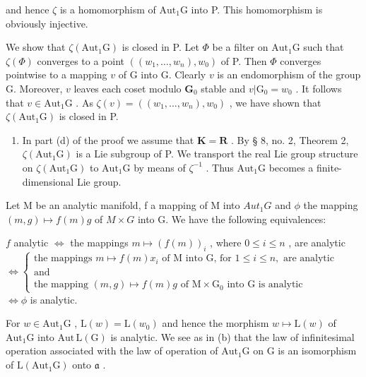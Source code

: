 and hence \(\zeta\) is a homomorphism of \(\mathrm{Aut}_1\mathrm{G}\) into P. This homomorphism is obviously injective.

We show that \(\zeta(\mathrm{Aut}_1\mathrm{G})\) is closed in P. Let \(\Phi\) be a filter on \(\mathrm{Aut}_1\mathrm{G}\) such that \(\zeta(\Phi)\) converges to a point \(((w_1,\dots,w_n),w_0)\) of P. Then \(\Phi\) converges pointwise to a mapping \(v\) of G into G. Clearly \(v\) is an endomorphism of the group G. Moreover, \(v\) leaves each coset modulo \(\mathbf{G}_0\) stable and \(v |\mathrm{G}_0 = w_0\) . It follows that \(v\in \mathrm{Aut}_1\mathrm{G}\) . As \(\zeta(v) = ((w_1,\dots,w_n),w_0)\) , we have shown that \(\zeta(\mathrm{Aut}_1\mathrm{G})\) is closed in P.

\begin{enumerate}
\def\labelenumi{(\alph{enumi})}
\setcounter{enumi}{3}
\tightlist
\item
  In part (d) of the proof we assume that \(\mathbf{K} = \mathbf{R}\) . By § 8, no. 2, Theorem 2, \(\zeta(\mathrm{Aut}_1\mathrm{G})\) is a Lie subgroup of P. We transport the real Lie group structure on \(\zeta(\mathrm{Aut}_1\mathrm{G})\) to \(\mathrm{Aut}_1\mathrm{G}\) by means of \(\zeta^{-1}\) . Thus \(\mathrm{Aut}_1\mathrm{G}\) becomes a finite-dimensional Lie group.
\end{enumerate}

Let M be an analytic manifold, f a mapping of M into \(Aut_{1}G\) and \(\phi\) the mapping \((m,g)\mapsto f(m)g\) of \(M\times G\) into G. We have the following equivalences:

\(f\) analytic \(\Leftrightarrow\) the mappings \(m\mapsto (f(m))_i\) , where \(0\leqslant i\leqslant n\) , are analytic \(\Leftrightarrow \left\{ \begin{array}{ll}\text{the mappings } m\mapsto f(m)x_i\text{ of M into G, for } 1\leqslant i\leqslant n,\text{ are analytic} \\ \text{and} \\ \text{the mapping } (m,g)\mapsto f(m)g\text{ of M} \times \mathrm{G}_0\text{ into G is analytic} \end{array} \right.\) \(\Leftrightarrow \phi\) is analytic.

For \(w \in \mathrm{Aut}_1\mathrm{G}\) , \(\mathrm{L}(w) = \mathrm{L}(w_0)\) and hence the morphism \(w \mapsto \mathrm{L}(w)\) of \(\mathrm{Aut}_1\mathrm{G}\) into \(\mathrm{Aut}\, \mathrm{L}(\mathrm{G})\) is analytic. We see as in (b) that the law of infinitesimal operation associated with the law of operation of \(\mathrm{Aut}_1\mathrm{G}\) on \(\mathrm{G}\) is an isomorphism of \(\mathrm{L}(\mathrm{Aut}_1\mathrm{G})\) onto \(\mathfrak{a}\) .

